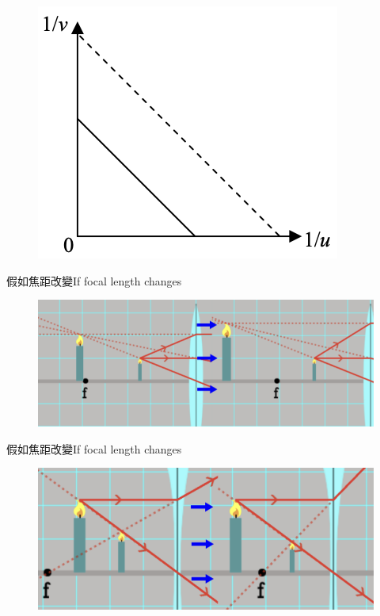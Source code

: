 \documentclass[beamer=true]{standalone}
\begin{document}
\begin{eg}
\begin{tasks}[item-indent=2em,label-offset=0em,before-skip=.3em,after-item-skip=.5em]
\begin{figure}
        \end{figure}
        \task
        \begin{figure}
            \centering
            \includegraphics[width=0.7\linewidth]{assets/deqdededqewdeqe.png}
        \end{figure}
    \end{tasks}
\end{eg}



\begin{frame}{假如焦距改變If focal length changes}
    \begin{figure}
        \centering
        \includegraphics[width=1\linewidth]{assets/x9n80ue213e.png}
    \end{figure}
\end{frame}

\begin{frame}{假如焦距改變If focal length changes}
    \begin{figure}
        \centering
        \includegraphics[width=1\linewidth]{assets/n9du82u8e.png}
    \end{figure}
\end{frame}
\end{document}
